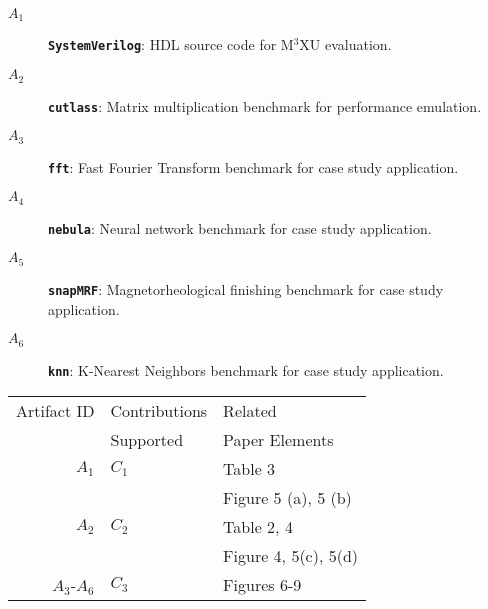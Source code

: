 \documentclass[conference]{IEEEtran}
\newcommand{\MPCMXU}[1]{M$^{3}$XU}
\begin{document}
\begin{description}
    \item[$A_1$] \textbf{\texttt{SystemVerilog}}: HDL source code for \MPCMXU{} evaluation.
    \item[$A_2$] \textbf{\texttt{cutlass}}: Matrix multiplication benchmark for performance emulation.
    \item[$A_3$] \textbf{\texttt{fft}}: Fast Fourier Transform benchmark for case study application.
    \item[$A_4$] \textbf{\texttt{nebula}}: Neural network benchmark for case study application.
    \item[$A_5$] \textbf{\texttt{snapMRF}}: Magnetorheological finishing benchmark for case study application.
    \item[$A_6$] \textbf{\texttt{knn}}: K-Nearest Neighbors benchmark for case study application.
\end{description}


\begin{center}
\begin{tabular}{rll}
\toprule
Artifact ID  &  Contributions &  Related \\
             &  Supported     &  Paper Elements \\
\midrule
$A_1$   &  $C_1$ & Table 3 \\
        &        & Figure 5 (a), 5 (b)\\
\midrule
$A_2$   &  $C_2$ & Table 2, 4 \\
        &        & Figure 4, 5(c), 5(d)\\
\midrule
$A_3$-$A_6$   &  $C_3$ & Figures 6-9 \\
\bottomrule
\end{tabular}
\end{center}
\end{document}
